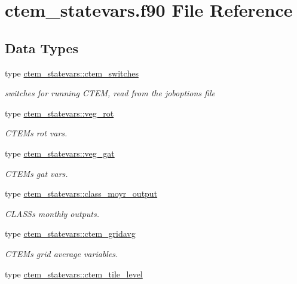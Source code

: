 \hypertarget{ctem__statevars_8f90}{}\section{ctem\+\_\+statevars.\+f90 File Reference}
\label{ctem__statevars_8f90}
\subsection*{Data Types}
\begin{DoxyCompactItemize}
\item 
type \hyperlink{structctem__statevars_1_1ctem__switches}{ctem\+\_\+statevars\+::ctem\+\_\+switches}
\begin{DoxyCompactList}\small\item\em switches for running C\+T\+E\+M, read from the joboptions file \end{DoxyCompactList}\item 
type \hyperlink{structctem__statevars_1_1veg__rot}{ctem\+\_\+statevars\+::veg\+\_\+rot}
\begin{DoxyCompactList}\small\item\em C\+T\+E\+M\textquotesingle{}s \textquotesingle{}rot\textquotesingle{} vars. \end{DoxyCompactList}\item 
type \hyperlink{structctem__statevars_1_1veg__gat}{ctem\+\_\+statevars\+::veg\+\_\+gat}
\begin{DoxyCompactList}\small\item\em C\+T\+E\+M\textquotesingle{}s \textquotesingle{}gat\textquotesingle{} vars. \end{DoxyCompactList}\item 
type \hyperlink{structctem__statevars_1_1class__moyr__output}{ctem\+\_\+statevars\+::class\+\_\+moyr\+\_\+output}
\begin{DoxyCompactList}\small\item\em C\+L\+A\+S\+S\textquotesingle{}s monthly outputs. \end{DoxyCompactList}\item 
type \hyperlink{structctem__statevars_1_1ctem__gridavg}{ctem\+\_\+statevars\+::ctem\+\_\+gridavg}
\begin{DoxyCompactList}\small\item\em C\+T\+E\+M\textquotesingle{}s grid average variables. \end{DoxyCompactList}\item 
type \hyperlink{structctem__statevars_1_1ctem__tile__level}{ctem\+\_\+statevars\+::ctem\+\_\+tile\+\_\+level}

\end{DoxyCompactItemize}
